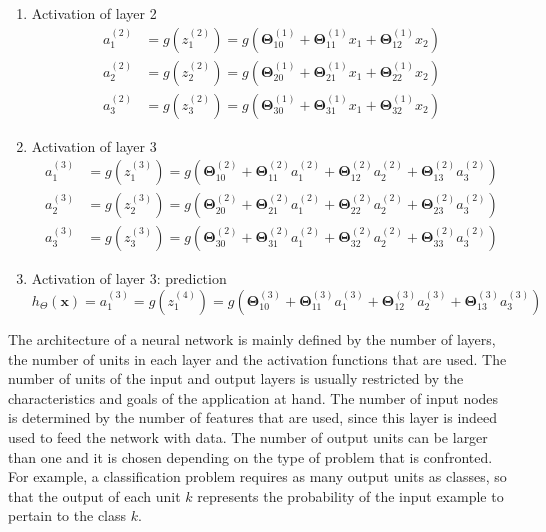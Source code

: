 \documentclass[a4paper, report, oneside, UKenglish]{memoir}
\newcommand{\x}{\boldsymbol{x}}
\newcommand{\bTheta}{\boldsymbol{\Theta}}
\begin{document}
\begin{enumerate}
    \item Activation of layer 2
    \begin{equation}
    \begin{split}
        a_1^{(2)} &= g(z_1^{(2)}) = g(\bTheta_{10}^{(1)} + \bTheta_{11}^{(1)} x_1 + \bTheta_{12}^{(1)} x_2) \\
        a_2^{(2)} &= g(z_2^{(2)}) = g(\bTheta_{20}^{(1)} + \bTheta_{21}^{(1)} x_1 + \bTheta_{22}^{(1)} x_2) \\
        a_3^{(2)} &= g(z_3^{(2)}) = g(\bTheta_{30}^{(1)} + \bTheta_{31}^{(1)} x_1 + \bTheta_{32}^{(1)} x_2)
    \end{split}
    \end{equation}
    \item Activation of layer 3
    \begin{equation}
    \begin{split}
        a_1^{(3)} &= g(z_1^{(3)}) = g(\bTheta_{10}^{(2)} + \bTheta_{11}^{(2)} a_1^{(2)} + \bTheta_{12}^{(2)} a_2^{(2)} + \bTheta_{13}^{(2)} a_3^{(2)}) \\
        a_2^{(3)} &= g(z_2^{(3)}) = g(\bTheta_{20}^{(2)} + \bTheta_{21}^{(2)} a_1^{(2)} + \bTheta_{22}^{(2)} a_2^{(2)} + \bTheta_{23}^{(2)} a_3^{(2)}) \\
        a_3^{(3)} &= g(z_3^{(3)}) = g(\bTheta_{30}^{(2)} + \bTheta_{31}^{(2)} a_1^{(2)} + \bTheta_{32}^{(2)} a_2^{(2)} + \bTheta_{33}^{(2)} a_3^{(2)})
    \end{split}
    \end{equation}
    \item Activation of layer 3: prediction
    \begin{equation}\label{eq:nn_cost_function}
        h_\Theta(\x) = a_1^{(3)} = g(z_1^{(4)}) = g(\bTheta_{10}^{(3)} + \bTheta_{11}^{(3)} a_1^{(3)} + \bTheta_{12}^{(3)} a_2^{(3)} + \bTheta_{13}^{(3)} a_3^{(3)})
    \end{equation}
\end{enumerate}

The architecture of a neural network is mainly defined by the number of layers, the number of units in each layer and the activation functions that are used. The number of units of the input and output layers is usually restricted by the characteristics and goals of the application at hand. The number of input nodes is determined by the number of features that are used, since this layer is indeed used to feed the network with data. The number of output units can be larger than one and it is chosen depending on the type of problem that is confronted. For example, a classification problem requires as many output units as classes, so that the output of each unit $k$ represents the probability of the input example to pertain to the class $k$. 
\end{document}

